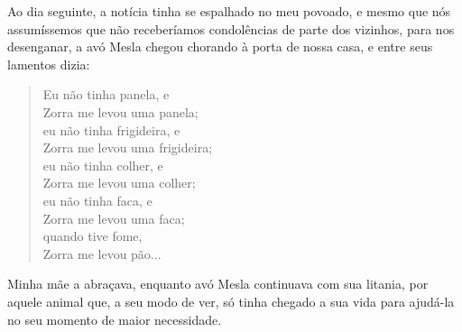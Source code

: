 Ao dia seguinte, a notícia tinha se espalhado no meu povoado, e mesmo que nós assumíssemos que não receberíamos condolências de parte dos vizinhos, para nos desenganar, a avó Mesla chegou chorando à porta de nossa casa, e entre seus lamentos dizia:
\begin{quotation}
\noindent Eu não tinha panela, e \\Zorra me levou uma panela;\\ 
eu não tinha frigideira, e \\Zorra me levou uma frigideira;\\ 
eu não tinha colher, e \\Zorra me levou uma colher;\\
eu não tinha faca, e \\Zorra me levou uma faca;\\
quando tive fome, \\Zorra me levou pão...  
\end{quotation}
Minha mãe a abraçava, enquanto avó Mesla continuava com sua litania, por aquele animal que, a seu modo de ver, só tinha chegado a sua vida para ajudá-la no seu momento de maior necessidade.
 

